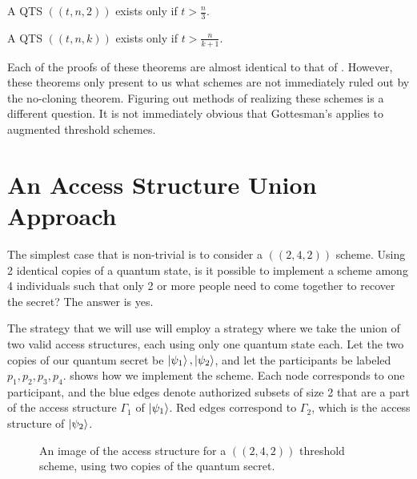 \begin{theorem}
	\label{thm:qts2}
	A QTS $((t,n, 2))$ exists only if $t > \frac{n}{3}$.
\end{theorem}

\begin{theorem}
	\label{thm:qtsk}
	A QTS $((t,n, k))$ exists only if $t > \frac{n}{k+1}$.
\end{theorem}

Each of the proofs of these theorems are almost identical to that of . However, these theorems only present to us what schemes are not immediately ruled out by the no-cloning theorem. Figuring out methods of realizing these schemes is a different question. It is not immediately obvious that Gottesman's  applies to augmented threshold schemes.

\section{An Access Structure Union Approach}

The simplest case that is non-trivial is to consider a $((2,4,2))$ scheme. Using 2 identical copies of a quantum state, is it possible to implement a scheme among 4 individuals such that only 2 or more people need to come together to recover the secret? The answer is yes.

The strategy that we will use will employ a strategy where we take the union of two valid access structures, each using only one quantum state each. Let the two copies of our quantum secret be $\ket{\psi_1}, \ket{\psi_2}$, and let the participants be labeled $p_1, p_2, p_3, p_4$.  shows how we implement the scheme. Each node corresponds to one participant, and the blue edges denote authorized subsets of size 2 that are a part of the access structure $\Gamma_1$ of $\ket{\psi_1}$. Red edges correspond to $\Gamma_2$, which is the access structure of $\ket{\psi_2}$.


\begin{figure}[ht]
	\begin{center}
	\end{center}
	\caption{An image of the access structure for a $((2,4,2))$ threshold scheme, using two copies of the quantum secret.}
	\label{fig:2-4-2}
\end{figure}


